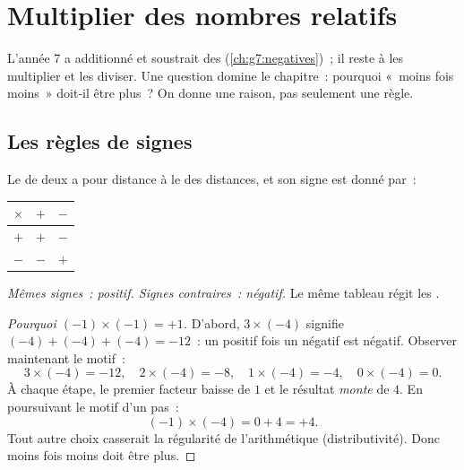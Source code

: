 \chapter{Multiplier des nombres relatifs}\label{ch:g8:negprod}

L'année 7 a additionné et soustrait des 
(\cref{ch:g7:negatives})~; il reste à les multiplier et les diviser.
Une question domine le chapitre~: pourquoi «~moins fois moins~» doit-il
être plus~? On donne une raison, pas seulement une règle.

\section{Les règles de signes}

\begin{theorem}\label{thm:g8:negprod:rules}
Le  de deux  a pour distance à  le 
des distances, et son signe est donné par~:
\begin{center}
\renewcommand{\arraystretch}{1.3}
\begin{tabular}{c|cc}
$\times$ & $+$ & $-$ \\
\hline
$+$ & $+$ & $-$ \\
$-$ & $-$ & $+$ \\
\end{tabular}
\end{center}
\emph{Mêmes signes~:  positif. Signes contraires~: 
négatif.} Le même tableau régit les .
\end{theorem}

\begin{proof}[Pourquoi $(-1) \times (-1) = +1$]
D'abord, $3 \times (-4)$ signifie $(-4) + (-4) + (-4) = -12$~: un
positif fois un négatif est négatif. Observer maintenant le motif~:
\[
3 \times (-4) = -12, \quad
2 \times (-4) = -8, \quad
1 \times (-4) = -4, \quad
0 \times (-4) = 0 .
\]
À chaque étape, le premier facteur baisse de $1$ et le résultat
\emph{monte} de $4$. En poursuivant le motif d'un pas~:
\[
(-1) \times (-4) = 0 + 4 = +4 .
\]
Tout autre choix casserait la régularité de l'arithmétique
(distributivité). Donc moins fois moins doit être plus.
\end{proof}

